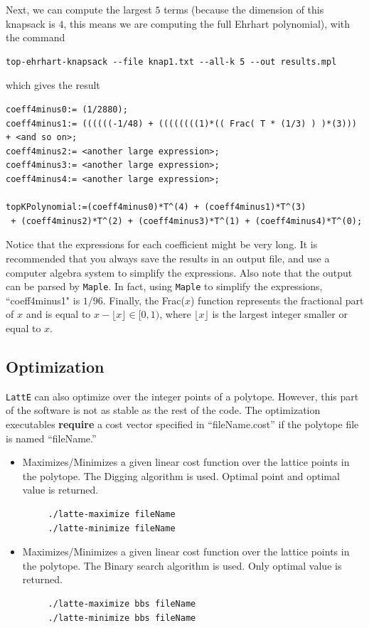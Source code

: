\documentclass{article}
\newcommand{\latte}{{\tt LattE}\xspace}
\newcommand{\maple}{{\tt Maple}\xspace}
\begin{document}
Next, we can compute the largest $5$ terms (because the dimension of this knapsack is $4$, this means we are computing the full Ehrhart polynomial), with the command
\begin{verbatim}
top-ehrhart-knapsack --file knap1.txt --all-k 5 --out results.mpl
\end{verbatim}
which gives the result
\begin{verbatim}
coeff4minus0:= (1/2880);
coeff4minus1:= ((((((-1/48) + ((((((((1)*(( Frac( T * (1/3) ) )*(3))) + <and so on>;
coeff4minus2:= <another large expression>;
coeff4minus3:= <another large expression>;
coeff4minus4:= <another large expression>;

topKPolynomial:=(coeff4minus0)*T^(4) + (coeff4minus1)*T^(3) 
 + (coeff4minus2)*T^(2) + (coeff4minus3)*T^(1) + (coeff4minus4)*T^(0);
\end{verbatim}
  
Notice that the expressions for each coefficient might be very long. It is recommended that you always save the results in an output file, and use a computer algebra system to simplify the expressions. Also note that the output can be parsed by \maple. In fact, using \maple to simplify the expressions, ``coeff4minus1" is $1/96$. Finally, the Frac($x$) function represents the fractional part of $x$ and is equal to $x - \lfloor x \rfloor \in [0,1)$, where $\lfloor x \rfloor$ is  the largest integer smaller or equal to $x$.


\subsection{Optimization}


\latte can also optimize over the integer points of a polytope. However, this part of the software is not as stable as the rest of the code. The optimization executables {\bf require} a cost vector specified in ``fileName.cost'' if the polytope file is named ``fileName.''

\begin{itemize}
\item Maximizes/Minimizes a given linear cost function over the lattice
  points in the polytope. The Digging algorithm
  \cite{latte3} is used. Optimal point and optimal value is returned. 
\begin{verbatim}
     ./latte-maximize fileName
     ./latte-minimize fileName
\end{verbatim} 
\item Maximizes/Minimizes a given linear cost function over the lattice
  points in the polytope. The Binary search
  algorithm is used. Only optimal value is returned. 
\begin{verbatim}
     ./latte-maximize bbs fileName
     ./latte-minimize bbs fileName
\end{verbatim} 
\end{itemize}
\end{document}
